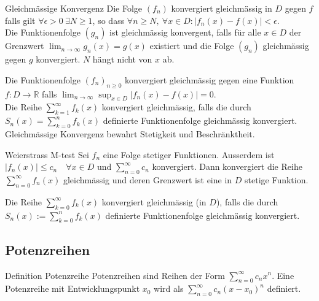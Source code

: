\documentclass[a4paper,10pt]{article}
\def\limn{\lim_{n\to \infty}}
\def\sumk{\sum_{k=1}^\infty}
\begin{document}
\begin{mainbox}{Gleichmässige Konvergenz}
 Die Folge $(f_n)$ konvergiert gleichmässig in $D$ gegen $f$ falls gilt $\forall \epsilon > 0 \ \exists N \ge 1$, so dass $\forall n \ge N, \ \forall x \in D: | f_n(x) - f(x) | < \epsilon$. \\
 Die Funktionenfolge $(g_n)$ ist gleichmässig konvergent, falls für alle $x\in D$ der Grenzwert $\limn g_n(x) = g(x)$ existiert und die Folge $(g_n)$ gleichmässig gegen $g$ konvergiert. $N$ hängt nicht von $x$ ab.
\end{mainbox}

Die Funktionenfolge $(f_n)_{n \geq 0}$ konvergiert gleichmässig gegen eine Funktion $f: D \rightarrow \mathbb{R}$ falls $\lim_{n \rightarrow \infty} \sup_{x \in D} |f_n(x) - f(x)| = 0$.\\

Die Reihe $\sumk f_k(x)$ konvergiert gleichmässig, falls die durch $S_n(x) = \sum_{k=0}^n f_k(x)$ definierte Funktionenfolge gleichmässig konvergiert.\\

Gleichmässige Konvergenz bewahrt Stetigkeit und Beschränktheit.

\begin{subbox}{Weierstrass M-test}
 Sei $f_n$ eine Folge stetiger Funktionen. Ausserdem ist $|f_n(x)| \le c_n \quad \forall x \in D$ und $\sum_{n=0}^\infty c_n$ konvergiert. Dann konvergiert die Reihe $\sum_{n=0}^\infty f_n(x)$ gleichmässig und deren Grenzwert ist eine in $D$ stetige Funktion.
\end{subbox}

\begin{subbox}{}
  Die Reihe $\sum_{k=0}^\infty f_k(x)$ konvergiert gleichmässig (in $D$), falls die durch $S_n(x) := \sum_{k=0}^n f_k(x)$ definierte Funktionenfolge gleichmässig konvergiert.
\end{subbox}

\subsection{Potenzreihen}
\begin{subbox}{Definition Potenzreihe}
 Potenzreihen sind Reihen der Form $\sum_{n=0}^\infty c_n x^n$. Eine Potenzreihe mit Entwicklungspunkt $x_0$ wird als $\sum_{n=0}^\infty c_n(x-x_0)^n$ definiert.
\end{subbox}
\end{document}
